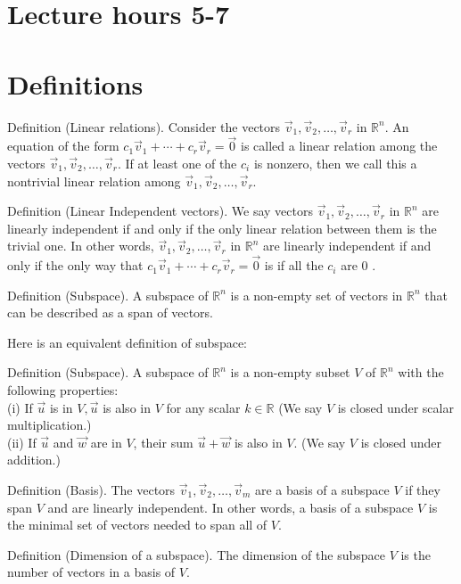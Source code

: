 \documentclass[10pt]{article}
\begin{document}
\section*{Lecture hours 5-7}
\section*{Definitions}
Definition (Linear relations). Consider the vectors $\vec{v}_{1}, \vec{v}_{2}, \ldots, \vec{v}_{r}$ in $\mathbb{R}^{n}$. An equation of the form $c_{1} \vec{v}_{1}+\cdots+c_{r} \vec{v}_{r}=\overrightarrow{0}$ is called a linear relation among the vectors $\vec{v}_{1}, \vec{v}_{2}, \ldots, \vec{v}_{r}$. If at least one of the $c_{i}$ is nonzero, then we call this a nontrivial linear relation among $\vec{v}_{1}, \vec{v}_{2}, \ldots, \vec{v}_{r}$.

Definition (Linear Independent vectors). We say vectors $\vec{v}_{1}, \vec{v}_{2}, \ldots, \vec{v}_{r}$ in $\mathbb{R}^{n}$ are linearly independent if and only if the only linear relation between them is the trivial one. In other words, $\vec{v}_{1}, \vec{v}_{2}, \ldots, \vec{v}_{r}$ in $\mathbb{R}^{n}$ are linearly independent if and only if the only way that $c_{1} \vec{v}_{1}+\cdots+c_{r} \vec{v}_{r}=\overrightarrow{0}$ is if all the $c_{i}$ are 0 .

Definition (Subspace). A subspace of $\mathbb{R}^{n}$ is a non-empty set of vectors in $\mathbb{R}^{n}$ that can be described as a span of vectors.

Here is an equivalent definition of subspace:

Definition (Subspace). A subspace of $\mathbb{R}^{n}$ is a non-empty subset $V$ of $\mathbb{R}^{n}$ with the following properties:\\
(i) If $\vec{u}$ is in $V, \vec{u}$ is also in $V$ for any scalar $k \in \mathbb{R}$ (We say $V$ is closed under scalar multiplication.)\\
(ii) If $\vec{u}$ and $\vec{w}$ are in $V$, their sum $\vec{u}+\vec{w}$ is also in $V$. (We say $V$ is closed under addition.)

Definition (Basis). The vectors $\vec{v}_{1}, \vec{v}_{2}, \ldots, \vec{v}_{m}$ are a basis of a subspace $V$ if they span $V$ and are linearly independent. In other words, a basis of a subspace $V$ is the minimal set of vectors needed to span all of $V$.

Definition (Dimension of a subspace). The dimension of the subspace $V$ is the number of vectors in a basis of $V$.
\end{document}
